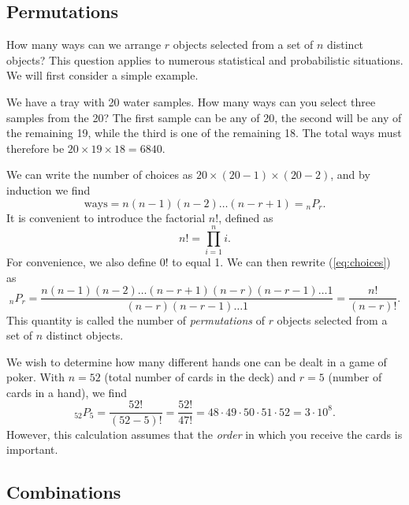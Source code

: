 \subsection{Permutations}
How many ways can we arrange $r$ objects selected from a set of $n$ distinct objects?
This question applies to numerous statistical and probabilistic situations.  We will first
consider a simple example.
\begin{example}
We have a tray with 20 water samples.  How many ways can you select three samples 
from  the 20?  The first sample can be any of 20, the second will be any of the remaining 19, while the third is one of 
the remaining 18.  The total ways must therefore be $20 \times 19 \times  18 = 6840$.
\end{example}
We can write the number of choices as $20 \times (20-1) \times (20-2)$, and by induction we find 
\begin{equation}
\mbox{ways} = n(n-1)(n-2)\ldots(n - r + 1 ) = {}_n P_r.
\label{eq:choices}
\end{equation}
It is convenient to introduce the factorial $n!$, defined as 
\begin{equation}
n! = \prod^n_{i=1} i.
\end{equation}
For convenience, we also define $0!$ to equal 1.  We can then rewrite (\ref{eq:choices}) as
\begin{equation}
_{n}P_{r} = \frac{n (n-1) (n-2) \ldots (n-r + 1) (n-r) (n-r -1) \dots 1}{(n-r) (n-r-1) \ldots 1} = \frac{n!}{(n-r)!}.	
\end{equation}
This quantity is called the number of \emph{permutations} of $r$ objects selected from a set of $n$ distinct 
objects.
\begin{example}
	We wish to determine how many different hands one can be dealt in a game of poker.
With $n = 52$ (total number of cards in the deck) and $r = 5$ (number of cards in a hand), we find
\begin{equation}
_{52} P_5 = \frac{52!}{(52-5)!} = \frac{52!}{47!} = 48 \cdot 49 \cdot 50 \cdot 51 \cdot 52 = 
3 \cdot 10^8.
\end{equation}	 
However, this calculation assumes that the \emph{order} in which you receive the cards is important.
\end{example}

\subsection{Combinations}

